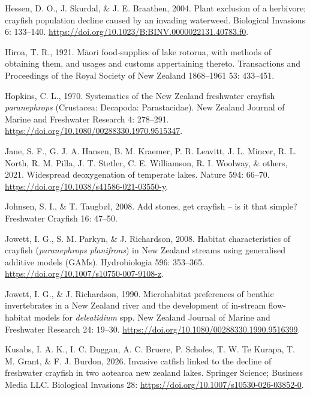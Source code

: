 \documentclass[
  letterpaper,
  DIV=11,
  numbers=noendperiod]{scrartcl}
\newlength{\cslhangindent}
\newenvironment{CSLReferences}[2] %
 {\begin{list}{}{%
  \setlength{\itemindent}{0pt}
  \setlength{\leftmargin}{0pt}
  \setlength{\parsep}{0pt}
  \ifodd #1
   \setlength{\leftmargin}{\cslhangindent}
   \setlength{\itemindent}{-1\cslhangindent}
  \fi
  \setlength{\itemsep}{#2\baselineskip}}}
 {\end{list}}
\begin{document}
\begin{CSLReferences}{0}{1}
Hessen, D. O., J. Skurdal, \& J. E. Braathen, 2004. Plant exclusion of a
herbivore; crayfish population decline caused by an invading waterweed.
Biological Invasions 6: 133--140.
\url{https://doi.org/10.1023/B:BINV.0000022131.40783.f0}.

Hiroa, T. R., 1921. M{ā}ori food-supplies of lake rotorua, with methods
of obtaining them, and usages and customs appertaining thereto.
Transactions and Proceedings of the Royal Society of New Zealand
1868--1961 53: 433--451.

Hopkins, C. L., 1970. Systematics of the {New Zealand} freshwater
crayfish \emph{paranephrops} ({Crustacea}: {Decapoda}: {Parastacidae}).
New Zealand Journal of Marine and Freshwater Research 4: 278--291.
\url{https://doi.org/10.1080/00288330.1970.9515347}.

{Jane, S. F., G. J. A. Hansen, B. M. Kraemer, P. R. Leavitt, J. L.
Mincer, R. L. North, R. M. Pilla, J. T. Stetler, C. E. Williamson, R. I.
Woolway, \& others}, 2021. Widespread deoxygenation of temperate lakes.
Nature 594: 66--70. \url{https://doi.org/10.1038/s41586-021-03550-y}.

Johnsen, S. I., \& T. Taugbøl, 2008. Add stones, get crayfish -- is it
that simple? Freshwater Crayfish 16: 47--50.

Jowett, I. G., S. M. Parkyn, \& J. Richardson, 2008. Habitat
characteristics of crayfish (\emph{paranephrops planifrons}) in {New
Zealand} streams using generalised additive models ({GAMs}).
Hydrobiologia 596: 353--365.
\url{https://doi.org/10.1007/s10750-007-9108-z}.

Jowett, I. G., \& J. Richardson, 1990. Microhabitat preferences of
benthic invertebrates in a {New Zealand} river and the development of
in-stream flow-habitat models for \emph{deleatidium} spp. New Zealand
Journal of Marine and Freshwater Research 24: 19--30.
\url{https://doi.org/10.1080/00288330.1990.9516399}.

Kusabs, I. A. K., I. C. Duggan, A. C. Bruere, P. Scholes, T. W. Te
Kurapa, T. M. Grant, \& F. J. Burdon, 2026. Invasive catfish linked to
the decline of freshwater crayfish in two aotearoa new zealand lakes.
Springer Science; Business Media LLC. Biological Invasions 28:
\url{https://doi.org/10.1007/s10530-026-03852-0}.


\end{CSLReferences}
\end{document}
